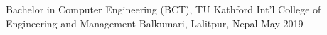 
\begin{cventries}
  \cventry
    {Bachelor in Computer Engineering (BCT), TU} %
    {Kathford Int’l College of Engineering and Management} %
    {Balkumari, Lalitpur, Nepal} %
    {May 2019} %
    {
    }
\end{cventries}
